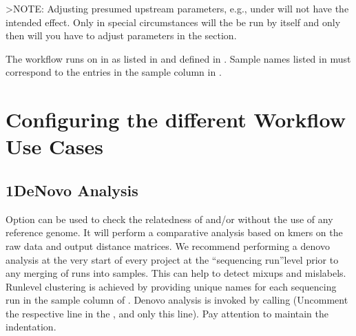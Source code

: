\documentclass[letterpaper,10pt,english]{sphinxmanual}
\begin{document}
\textgreater{}NOTE: Adjusting presumed upstream parameters, e.g., under  will not have the intended effect. Only in special circumstances will the  be run by itself and only then will you have to adjust parameters in the  section.

The workflow runs on  in  as listed in  and defined in . Sample names listed in  must correspond to the entries in the sample column in .


\section{Configuring the different Workflow Use Cases}
\label{\detokenize{index:configuring-the-different-workflow-use-cases}}

\subsection{1\sphinxhyphen{}De\sphinxhyphen{}Novo Analysis}
\label{\detokenize{index:de-novo-analysis}}
Option  can be used to check the relatedness of  and/or  without the use of any reference genome. It will perform a comparative analysis based on k\sphinxhyphen{}mers on the raw data and output distance matrices. We recommend performing a de\sphinxhyphen{}novo analysis at the very start of every project at the “sequencing run”\sphinxhyphen{}level prior to any merging of runs into samples. This can help to detect mix\sphinxhyphen{}ups and mislabels. Run\sphinxhyphen{}level clustering is achieved by providing unique names for each sequencing run in the sample column of . De\sphinxhyphen{}novo analysis is invoked by calling  (Uncomment the respective line in the , and only this line). Pay attention to maintain the indentation.

\begin{sphinxVerbatim}[commandchars=\\\{\}]
 
\end{sphinxVerbatim}
\end{document}

